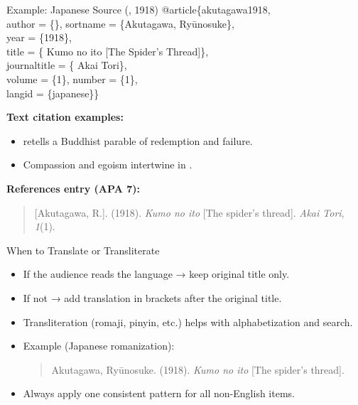 \documentclass[aspectratio=169]{beamer}
\begin{document}
\begin{frame}{Example: Japanese Source (, 1918)}
\small
{\ttfamily
@article\{akutagawa1918,\\
\hspace*{2em}author = \{\},
\hspace*{2em}sortname = \{Akutagawa, Ryūnosuke\}, \\
\hspace*{2em}year = \{1918\},\\
\hspace*{2em}title = \{ Kumo no ito [The Spider's Thread]\},\\
\hspace*{2em}journaltitle = \{ Akai Tori\},\\
\hspace*{2em}volume = \{1\}, number = \{1\},\\
\hspace*{2em}langid = \{japanese\}\}\\
}
\vspace{1ex}

\textbf{Text citation examples:}
\begin{itemize}
  \item \citet{akutagawa1918} retells a Buddhist parable of redemption and failure.
  \item Compassion and egoism intertwine in  \citep{akutagawa1918}.
\end{itemize}

\textbf{References entry (APA 7):}
\begin{quote}
 [Akutagawa, R.]. (1918).  \emph{Kumo no ito}
[The spider's thread]. \emph{ Akai Tori}, \emph{1}(1).
\end{quote}


\end{frame}



\begin{frame}{When to Translate or Transliterate}
\begin{itemize}
  \item If the audience reads the language → keep original title only.
  \item If not → add translation in brackets after the original title.
  \item Transliteration (romaji, pinyin, etc.) helps with alphabetization and search.
  \item Example (Japanese romanization):
    \begin{quote}\small
    Akutagawa, Ryūnosuke. (1918). \emph{Kumo no ito} [The spider's thread].
    \end{quote}
  \item Always apply one consistent pattern for all non-English items.
\end{itemize}
\end{frame}
\end{document}
